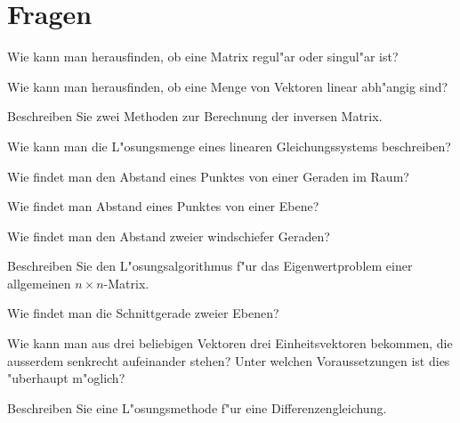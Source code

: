 \documentclass[a4paper,12pt,twocolumn]{article}
\begin{document}
\section{Fragen}
\begin{compactenum}
\item Wie kann man herausfinden, ob eine Matrix regul"ar oder singul"ar ist?
\item Wie kann man herausfinden, ob eine Menge von Vektoren linear
abh"angig sind?
\item Beschreiben Sie zwei Methoden zur Berechnung der inversen Matrix.
\item Wie kann man die L"osungsmenge eines linearen Gleichungssystems
beschreiben?
\item Wie findet man den Abstand eines Punktes von einer Geraden im Raum?
\item Wie findet man Abstand eines Punktes von einer Ebene?
\item Wie findet man den Abstand zweier windschiefer Geraden?
\item Beschreiben Sie den L"osungsalgorithmus f"ur das Eigenwertproblem
einer allgemeinen $n\times n$-Matrix.
\item Wie findet man die Schnittgerade zweier Ebenen?
\item Wie kann man aus drei beliebigen Vektoren drei Einheitsvektoren
bekommen, die ausserdem senkrecht aufeinander stehen?
Unter welchen Voraussetzungen ist dies "uberhaupt m"oglich?
\item Beschreiben Sie eine L"osungsmethode f"ur eine Differenzengleichung.
\end{compactenum}
\end{document}
